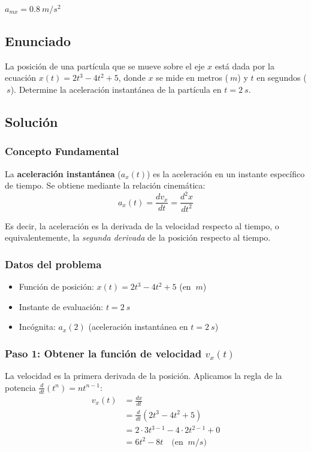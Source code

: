 \documentclass[12pt, a4paper]{article}
\begin{document}
\begin{tcolorbox}[colback=blue!5!white, colframe=blue!75!black, title=Respuesta Final]
\centering
\Large $\boxed{a_{mx} = \SI{0.8}{m/s^2}}$
\end{tcolorbox}

\newpage

\subsection*{Enunciado}
La posición de una partícula que se mueve sobre el eje $x$ está dada por la ecuación $x(t) = 2t^3 - 4t^2 + 5$, donde $x$ se mide en metros ($\SI{}{m}$) y $t$ en segundos ($\SI{}{s}$). Determine la aceleración instantánea de la partícula en $t = \SI{2}{s}$.

\subsection*{Solución}

\subsubsection*{Concepto Fundamental}
La \textbf{aceleración instantánea} ($a_x(t)$) es la aceleración en un instante específico de tiempo. Se obtiene mediante la relación cinemática:
\begin{equation}
a_x(t) = \frac{dv_x}{dt} = \frac{d^2x}{dt^2}
\end{equation}

Es decir, la aceleración es la derivada de la velocidad respecto al tiempo, o equivalentemente, la \textit{segunda derivada} de la posición respecto al tiempo.

\subsubsection*{Datos del problema}
\begin{itemize}[leftmargin=2cm]
    \item Función de posición: $x(t) = 2t^3 - 4t^2 + 5$ (en $\SI{}{m}$)
    \item Instante de evaluación: $t = \SI{2}{s}$
    \item Incógnita: $a_x(2)$ (aceleración instantánea en $t = \SI{2}{s}$)
\end{itemize}

\subsubsection*{Paso 1: Obtener la función de velocidad $v_x(t)$}
La velocidad es la primera derivada de la posición. Aplicamos la regla de la potencia $\frac{d}{dt}(t^n) = nt^{n-1}$:
\begin{align*}
v_x(t) &= \frac{dx}{dt} \\
&= \frac{d}{dt}(2t^3 - 4t^2 + 5) \\
&= 2 \cdot 3t^{3-1} - 4 \cdot 2t^{2-1} + 0 \\
&= 6t^2 - 8t \quad \text{(en } \SI{}{m/s}\text{)}
\end{align*}
\end{document}
